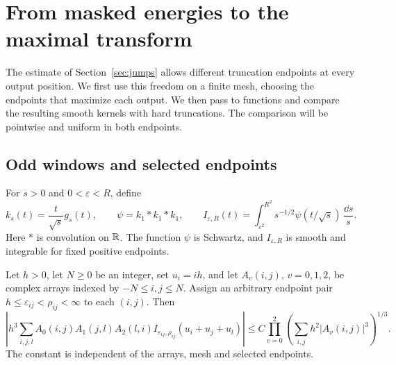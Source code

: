 \section{From masked energies to the maximal transform}\label{sec:maximal}

The estimate of Section~\ref{sec:jumps} allows different truncation
endpoints at every output position. We first use this freedom on a finite
mesh, choosing the endpoints that maximize each output. We then pass to
functions and compare the resulting smooth kernels with hard truncations.
The comparison will be pointwise and uniform in both endpoints.

\subsection{Odd windows and selected endpoints}

For $s>0$ and $0<\varepsilon<R$, define
\[
 k_s(t)=\frac{t}{\sqrt{s}}g_s(t),\qquad
 \psi=k_1*k_1*k_1,\qquad
 I_{\varepsilon,R}(t)=\int_{\varepsilon^2}^{R^2}
       s^{-1/2}\psi(t/\sqrt{s})\,\frac{\dd s}{s}.
\]
Here $*$ is convolution on $\mathbb R$. The function $\psi$ is Schwartz, and
$I_{\varepsilon,R}$ is smooth and integrable for fixed positive endpoints.

\begin{proposition}\label{prop:selected-kernel}
Let $h>0$, let $N\ge0$ be an integer, set $u_i=ih$, and let
$A_v(i,j)$, $v=0,1,2$, be complex
arrays indexed by $-N\le i,j\le N$. Assign an arbitrary endpoint pair
$h\le\varepsilon_{ij}<\rho_{ij}<\infty$ to each $(i,j)$. Then
\begin{equation}\label{eq:selected-kernel}
 \left|h^3\sum_{i,j,l}A_0(i,j)A_1(j,l)A_2(l,i)
       I_{\varepsilon_{ij},\rho_{ij}}(u_i+u_j+u_l)\right|
 \le C\prod_{v=0}^2\left(\sum_{i,j}h^2|A_v(i,j)|^3\right)^{1/3}.
\end{equation}
The constant is independent of the arrays, mesh and selected endpoints.
\end{proposition}

